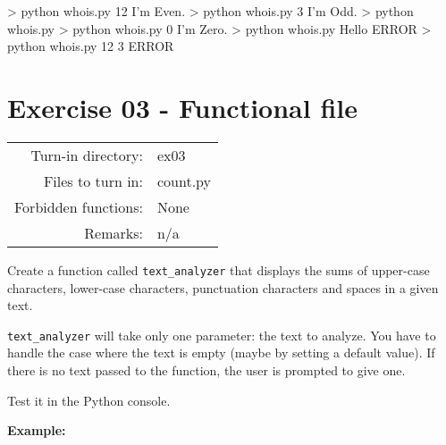 \documentclass[]{article}
\newenvironment{Shaded}{\begin{snugshade}}{\end{snugshade}}
\newcommand{\NormalTok}[1]{\textcolor[rgb]{0.81,0.81,0.76}{#1}}
\begin{document}
\begin{Shaded}
\begin{Highlighting}[]
\NormalTok{> python whois.py 12}
\NormalTok{I'm Even.}
\NormalTok{> python whois.py 3}
\NormalTok{I'm Odd.}
\NormalTok{> python whois.py}
\NormalTok{> python whois.py 0}
\NormalTok{I'm Zero.}
\NormalTok{> python whois.py Hello}
\NormalTok{ERROR}
\NormalTok{> python whois.py 12 3}
\NormalTok{ERROR}
\end{Highlighting}
\end{Shaded}

\clearpage

\hypertarget{exercise-03---functional-file-1}{%
\section{Exercise 03 - Functional
file}\label{exercise-03---functional-file-1}}

\begin{longtable}[]{@{}rl@{}}
\toprule
\endhead
Turn-in directory: & ex03\tabularnewline
Files to turn in: & count.py\tabularnewline
Forbidden functions: & None\tabularnewline
Remarks: & n/a\tabularnewline
\bottomrule
\end{longtable}

Create a function called \texttt{text\_analyzer} that displays the sums
of upper-case characters, lower-case characters, punctuation characters
and spaces in a given text.

\texttt{text\_analyzer} will take only one parameter: the text to
analyze. You have to handle the case where the text is empty (maybe by
setting a default value). If there is no text passed to the function,
the user is prompted to give one.

Test it in the Python console.

\textbf{Example:}
\end{document}
